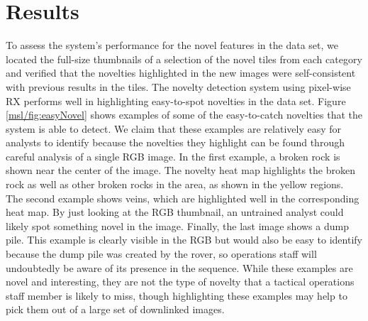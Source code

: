 \section{Results}
To assess the system's performance for the novel features in the \cite{kerner_data} data set, we located the full-size thumbnails of a selection of the novel tiles from each category and verified that the novelties highlighted in the new images were self-consistent with previous results in the tiles. 
The novelty detection system using pixel-wise RX performs well in highlighting easy-to-spot novelties in the data set. 
Figure \ref{msl/fig:easyNovel} shows examples of some of the easy-to-catch novelties that the system is able to detect. 
We claim that these examples are relatively easy for analysts to identify because the novelties they highlight can be found through careful analysis of a single RGB image.
In the first example, a broken rock is shown near the center of the image.
The novelty heat map highlights the broken rock as well as other broken rocks in the area, as shown in the yellow regions.
The second example shows veins, which are highlighted well in the corresponding heat map. 
By just looking at the RGB thumbnail, an untrained analyst could likely spot something novel in the image. 
Finally, the last image shows a dump pile.
This example is clearly visible in the RGB but would also be easy to identify because the dump pile was created by the rover, so operations staff will undoubtedly be aware of its presence in the sequence. 
While these examples are novel and interesting, they are not the type of novelty that a tactical operations staff member is likely to miss, though highlighting these examples may help to pick them out of a large set of downlinked images. 

